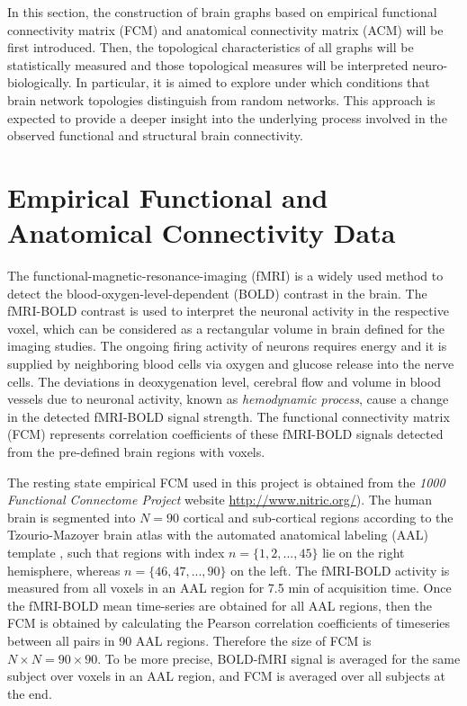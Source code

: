 In this section, the construction of brain graphs based on empirical functional connectivity matrix (FCM) and anatomical connectivity matrix (ACM) will be first introduced. Then, the topological characteristics of all graphs will be statistically measured and those topological measures will be interpreted neuro-biologically. In particular, it is aimed to explore under which conditions that brain network topologies distinguish from random networks. This approach is expected to provide a deeper insight into the underlying process involved in the observed functional and structural brain connectivity. 


\section{Empirical Functional and Anatomical Connectivity Data}

The functional-magnetic-resonance-imaging (fMRI) is a widely used method to detect the blood-oxygen-level-dependent (BOLD) contrast in the brain. The fMRI-BOLD contrast is used to interpret the neuronal activity in the respective voxel, which can be considered as a rectangular volume in brain defined for the imaging studies. The ongoing firing activity of neurons requires energy and it is supplied by neighboring blood cells via oxygen and glucose release into the nerve cells. The deviations in deoxygenation level, cerebral flow and volume in blood vessels due to neuronal activity, known as \textit{hemodynamic process}, cause a change in the detected fMRI-BOLD signal strength. The functional connectivity matrix (FCM) represents correlation coefficients of these fMRI-BOLD signals detected from the pre-defined brain regions with voxels. 

The resting state empirical FCM used in this project is obtained from the \textit{1000 Functional Connectome Project} website \url{http://www.nitric.org/}). The human brain is segmented into $N=90$ cortical and sub-cortical regions according to the Tzourio-Mazoyer brain atlas with the automated anatomical labeling (AAL) template  \citep{TZO02}, such that regions with index $n=\{1,2,...,45\}$ lie on the right hemisphere, whereas $n=\{46,47,...,90\}$ on the left. The fMRI-BOLD activity is measured from all voxels in an AAL region for 7.5 min of acquisition time. Once the fMRI-BOLD mean time-series are obtained for all AAL regions, then the FCM is obtained by calculating the Pearson correlation coefficients of timeseries between all pairs in 90 AAL regions. Therefore the size of FCM is $N\times N = 90 \times 90$.  To be more precise, BOLD-fMRI signal is averaged for the same subject over voxels in an AAL region, and FCM is averaged over all subjects at the end. 

